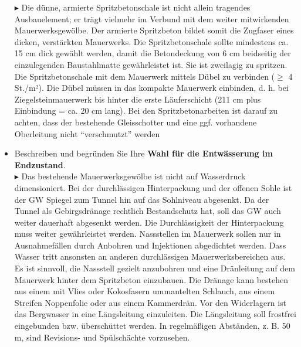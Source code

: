 \documentclass[fleqn,twoside]{article}
\begin{document}
\begin{small}
\begin{itemize}
    $\blacktriangleright$ Die dünne, armierte Spritzbetonschale ist nicht allein tragendes Ausbauelement; er trägt vielmehr im Verbund mit dem weiter mitwirkenden Mauerwerksgewölbe. Der armierte Spritzbeton bildet somit die Zugfaser eines dicken, verstärkten Mauerwerks. Die Spritzbetonschale sollte mindestens ca. 15 cm dick gewählt werden, damit die Betondeckung von 6 cm beidseitig der einzulegenden Baustahlmatte gewährleistet ist. Sie ist zweilagig zu spritzen. Die Spritzbetonschale mit dem Mauerwerk mittels Dübel zu verbinden ($\geq$ 4 St./m²). Die Dübel müssen in das kompakte Mauerwerk einbinden, d. h. bei Ziegelsteinmauerwerk bis hinter die erste Läuferschicht (211 cm plus Einbindung = ca. 20 cm lang). Bei den Spritzbetonarbeiten ist darauf zu achten, dass der bestehende Gleisschotter und eine ggf. vorhandene Oberleitung nicht \enquote{verschmutzt} werden    
    \item Beschreiben und begründen Sie Ihre \textbf{Wahl für die Entwässerung im Endzustand}.\\
    $\blacktriangleright$ Das bestehende Mauerwerksgewölbe ist nicht auf Wasserdruck dimensioniert. Bei der durchlässigen Hinterpackung und der offenen Sohle ist der GW Spiegel zum Tunnel hin auf das Sohlniveau abgesenkt. Da der Tunnel als Gebirgsdränage rechtlich Bestandschutz hat, soll das GW auch weiter dauerhaft abgesenkt werden. Die Durchlässigkeit der Hinterpackung muss weiter gewährleistet werden. Nassstellen im Mauerwerk sollen nur in Ausnahmefällen durch Anbohren und Injektionen abgedichtet werden. Dass Wasser tritt ansonsten an anderen durchlässigen Mauerwerksbereichen aus. Es ist sinnvoll, die Nassstell gezielt anzubohren und eine Dränleitung auf dem Mauerwerk hinter dem Spritzbeton einzubauen. Die Dränage kann bestehen aus einem mit Vlies oder Kokosfasern ummantelten Schlauch, aus einem Streifen Noppenfolie oder aus einem Kammerdrän. Vor den Widerlagern ist das Bergwasser in eine Längsleitung einzuleiten. Die Längsleitung soll frostfrei eingebunden bzw. überschüttet werden. In regelmäßigen Abständen, z. B. 50 m, sind Revisions- und Spülschächte vorzusehen.
    

\end{itemize}
\end{small}
\end{document}
